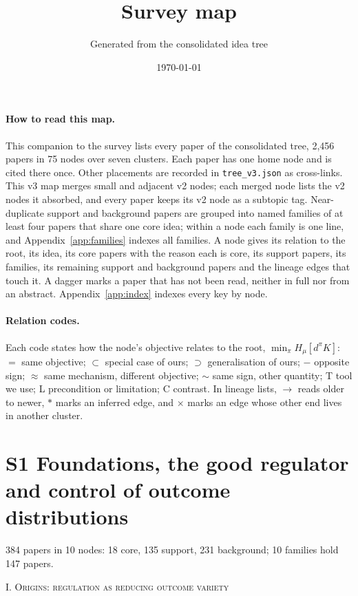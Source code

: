 \documentclass[10pt]{article}
\title{Survey map}
\author{Generated from the consolidated idea tree}
\date{\today}
\begin{document}
\maketitle
\small
\paragraph{How to read this map.} This companion to the survey lists every paper of the consolidated tree{,} 2{,}456 papers in 75 nodes over seven clusters. Each paper has one home node and is cited there once. Other placements are recorded in \texttt{tree\_v3.json} as cross-links. This v3 map merges small and adjacent v2 nodes; each merged node lists the v2 nodes it absorbed, and every paper keeps its v2 node as a subtopic tag. Near-duplicate support and background papers are grouped into named families of at least four papers that share one core idea; within a node each family is one line, and Appendix~\ref{app:families} indexes all families. A node gives its relation to the root, its idea, its core papers with the reason each is core, its support papers, its families, its remaining support and background papers and the lineage edges that touch it. A dagger \dag{} marks a paper that has not been read, neither in full nor from an abstract. Appendix~\ref{app:index} indexes every key by node.

\paragraph{Relation codes.} Each code states how the node's objective relates to the root, $\min_\pi H_\mu[d^\pi K]$: $=$ same objective; $\subset$ special case of ours; $\supset$ generalisation of ours; $-$ opposite sign; $\approx$ same mechanism, different objective; $\sim$ same sign, other quantity; \textsf{T} tool we use; \textsf{L} precondition or limitation; \textsf{C} contrast. In lineage lists, $\to$ reads older to newer, $\ast$ marks an inferred edge, and $\times$ marks an edge whose other end lives in another cluster.

\section{S1 Foundations, the good regulator and control of outcome distributions}
384 papers in 10 nodes: 18 core, 135 support, 231 background; 10 families hold 147 papers.

\medskip\textsc{I. Origins: regulation as reducing outcome variety}
\end{document}
